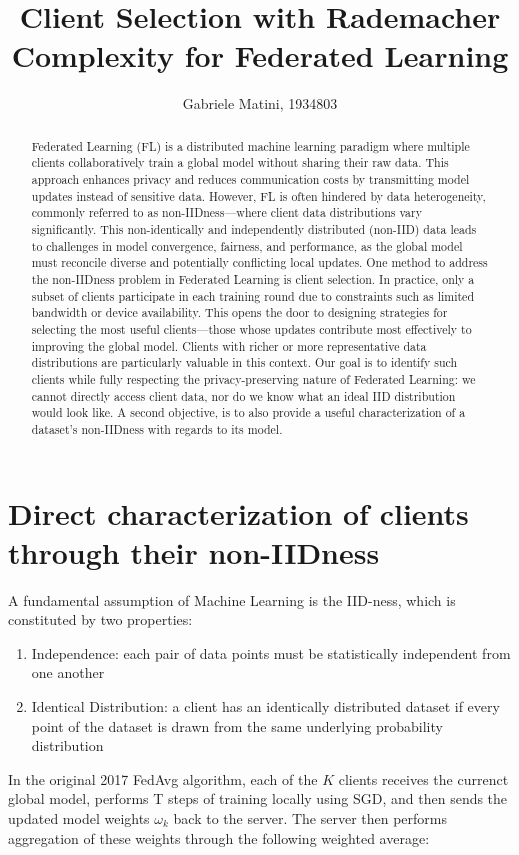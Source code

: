 \documentclass{article}
\title{Client Selection with Rademacher Complexity for Federated Learning}
\author{Gabriele Matini, 1934803}
\date{}
\begin{document}
\maketitle

\begin{abstract}
Federated Learning (FL) is a distributed machine learning paradigm where multiple clients collaboratively train a global model without sharing their raw data. This approach enhances privacy and reduces communication costs by transmitting model updates instead of sensitive data. However, FL is often hindered by data heterogeneity, commonly referred to as non-IIDness—where client data distributions vary significantly. This non-identically and independently distributed (non-IID) data leads to challenges in model convergence, fairness, and performance, as the global model must reconcile diverse and potentially conflicting local updates. One method to address the non-IIDness problem in Federated Learning is client selection. In practice, only a subset of clients participate in each training round due to constraints such as limited bandwidth or device availability. This opens the door to designing strategies for selecting the most useful clients—those whose updates contribute most effectively to improving the global model. Clients with richer or more representative data distributions are particularly valuable in this context. Our goal is to identify such clients while fully respecting the privacy-preserving nature of Federated Learning: we cannot directly access client data, nor do we know what an ideal IID distribution would look like. A second objective, is to also provide a useful characterization of a dataset's non-IIDness with regards to its model.
\end{abstract}

\section{Direct characterization of clients through their non-IIDness}
A fundamental assumption of Machine Learning is the IID-ness, which is constituted by two properties:
\begin{enumerate}
    \item Independence: each pair of data points must be statistically independent from one another
    \item Identical Distribution: a client has an identically distributed dataset if every point of the dataset is drawn from the same underlying probability distribution
\end{enumerate}
In the original 2017 FedAvg algorithm, each of the $K$ clients receives the currenct global model, performs T steps of training locally using SGD, and then sends the updated model weights $\omega_k$ back to the server. The server then performs aggregation of these weights through the following weighted average:
\end{document}
